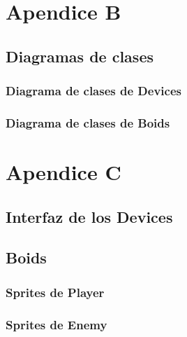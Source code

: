 \documentclass[a4paper,10pt]{article}
\begin{document}
\cleardoublepage

\section{Apendice B}
\subsection{Diagramas de clases}
\subsubsection{Diagrama de clases de Devices}
\subsubsection{Diagrama de clases de Boids}
\cleardoublepage

\section{Apendice C}
\subsection{Interfaz de los Devices}

\subsection{Boids}
\subsubsection{Sprites de Player}
\subsubsection{Sprites de Enemy}
\cleardoublepage
\end{document}
